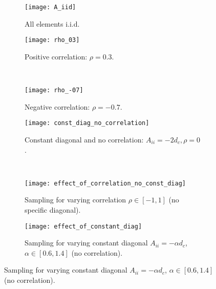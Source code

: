 \documentclass[10pt]{article}
\begin{document}
\begin{figure}[tb]
    \begin{subfigure}{.47\textwidth}
      \centering
        \texttt{[image: A\_iid]}
        \caption[A iid]{ 
            All elements i.i.d.
        }
        \label{fig:A_iid}
    \end{subfigure}%
    \begin{subfigure}{.47\textwidth}
        \centering
        \texttt{[image: rho\_03]}
        \caption[rho 0.3]{
            Positive correlation:
            $\rho = 0.3$. 
        }
        \label{fig:rho_03}
    \end{subfigure} 
\vspace{0.5cm}
\\
    \begin{subfigure}{.47\textwidth}
      \centering
        \texttt{[image: rho\_-07]}
        \caption[rho -0.7]{
            Negative correlation:
            $\rho = -0.7$. 
        }
        \label{fig:rho_-07}
    \end{subfigure}
    \begin{subfigure}{.47\textwidth}
      \centering
        \texttt{[image: const\_diag\_no\_correlation]}
        \caption[rho -0.7]{
            Constant diagonal and no correlation:
        $A_{ii} = -2 d_c, \rho = 0$.
        }
        \label{fig:const_diag_no_correlation}
    \end{subfigure}
\vspace{0.5cm}
\\
    \begin{subfigure}{.47\textwidth}
        \centering
        \texttt{[image: effect\_of\_correlation\_no\_const\_diag]}
        \caption[Effect of correlation]{
            Sampling for varying correlation $\rho \in [-1, 1]$ (no specific diagonal).
        }
        \label{fig:effect_of_correlation_no_const_diag}
    \end{subfigure}
    \begin{subfigure}{.47\textwidth}
        \centering
        \texttt{[image: effect\_of\_constant\_diag]}
        \caption[Exploding error]{
            Sampling for varying constant diagonal $A_{ii} = -\alpha d_c$,
            $\alpha \in [0.6, 1.4]$ (no correlation).
        }
        \label{fig:effect_of_constant_diag}
    \end{subfigure}


\end{figure}
\end{document}

